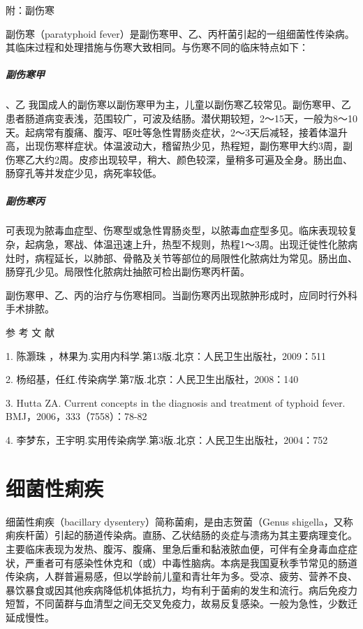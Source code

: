 \hypertarget{text00225.htmlux5cux23CHP7-8-3-5}{}
附：副伤寒

副伤寒（paratyphoid
fever）是副伤寒甲、乙、丙杆菌引起的一组细菌性传染病。其临床过程和处理措施与伤寒大致相同。与伤寒不同的临床特点如下：

\paragraph{副伤寒甲}

、乙
我国成人的副伤寒以副伤寒甲为主，儿童以副伤寒乙较常见。副伤寒甲、乙患者肠道病变表浅，范围较广，可波及结肠。潜伏期较短，2～15天，一般为8～10天。起病常有腹痛、腹泻、呕吐等急性胃肠炎症状，2～3天后减轻，接着体温升高，出现伤寒样症状。体温波动大，稽留热少见，热程短，副伤寒甲大约3周，副伤寒乙大约2周。皮疹出现较早，稍大、颜色较深，量稍多可遍及全身。肠出血、肠穿孔等并发症少见，病死率较低。

\paragraph{副伤寒丙}

可表现为脓毒血症型、伤寒型或急性胃肠炎型，以脓毒血症型多见。临床表现较复杂，起病急，寒战、体温迅速上升，热型不规则，热程1～3周。出现迁徙性化脓病灶时，病程延长，以肺部、骨骼及关节等部位的局限性化脓病灶为常见。肠出血、肠穿孔少见。局限性化脓病灶抽脓可检出副伤寒丙杆菌。

副伤寒甲、乙、丙的治疗与伤寒相同。当副伤寒丙出现脓肿形成时，应同时行外科手术排脓。

\protect\hypertarget{text00226.html}{}{}

\hypertarget{text00226.htmlux5cux23CHP7-8-4}{}
参 考 文 献

1. 陈灏珠 ，林果为.实用内科学.第13版.北京：人民卫生出版社，2009：511

2. 杨绍基，任红.传染病学.第7版.北京：人民卫生出版社，2008：140

3. Hutta ZA. Current concepts in the diagnosis and treatment of typhoid
fever. BMJ，2006，333（7558）：78-82

4. 李梦东，王宇明.实用传染病学.第3版.北京：人民卫生出版社，2004：752

\protect\hypertarget{text00227.html}{}{}

\chapter{细菌性痢疾}

细菌性痢疾（bacillary dysentery）简称菌痢，是由志贺菌（Genus
shigella，又称痢疾杆菌）引起的肠道传染病。直肠、乙状结肠的炎症与溃疡为其主要病理变化。主要临床表现为发热、腹泻、腹痛、里急后重和黏液脓血便，可伴有全身毒血症症状，严重者可有感染性休克和（或）中毒性脑病。本病是我国夏秋季节常见的肠道传染病，人群普遍易感，但以学龄前儿童和青壮年为多。受凉、疲劳、营养不良、暴饮暴食或因其他疾病降低机体抵抗力，均有利于菌痢的发生和流行。病后免疫力短暂，不同菌群与血清型之间无交叉免疫力，故易反复感染。一般为急性，少数迁延成慢性。


